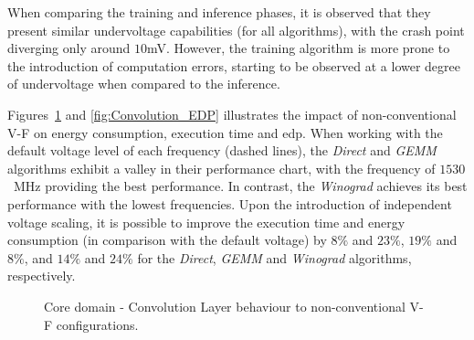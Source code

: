 When comparing the training and inference phases, it is observed that they present similar undervoltage capabilities (for all algorithms), with the crash point diverging only around $10$mV. However, the training algorithm is more prone to the introduction of computation errors, starting to be observed at a lower degree of undervoltage when compared to the inference.

Figures~\ref{fig:Convolution_behaviour} and \ref{fig:Convolution_EDP} illustrates the impact of non-conventional V-F on energy consumption, execution time and \acrshort{edp}. When working with the default voltage level of each frequency (dashed lines), the \textit{Direct} and \textit{GEMM} algorithms exhibit a valley in their performance chart, with the frequency of $1530$~MHz providing the best performance. In contrast, the \textit{Winograd} achieves its best performance with the lowest frequencies. Upon the introduction of independent voltage scaling, it is possible to improve the execution time and energy consumption (in comparison with the default voltage) by $8\%$ and $23\%$, $19\%$ and $8\%$, and $14\%$ and $24\%$ for the \textit{Direct}, \textit{GEMM} and \textit{Winograd} algorithms, respectively. 

\begin{figure}[htb]
  \begin{subfigmatrix}{2}
  \end{subfigmatrix}
  \caption{Core domain - Convolution Layer behaviour to non-conventional V-F configurations.}
  \label{fig:Convolution_behaviour}
\end{figure}

